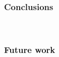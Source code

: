 \begin{frame}[t]
	\frametitle{Conclusions}
	\framesubtitle{~~}  %


\end{frame}



\begin{frame}[t]
	\frametitle{Future work}
	\framesubtitle{~~}  %


\end{frame}


